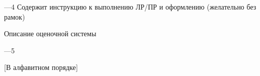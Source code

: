 
---4
Содержит инструкцию к выполнению ЛР/ПР и оформлению (желательно без рамок)

Описание оценочной системы

---5

[В алфавитном порядке]
